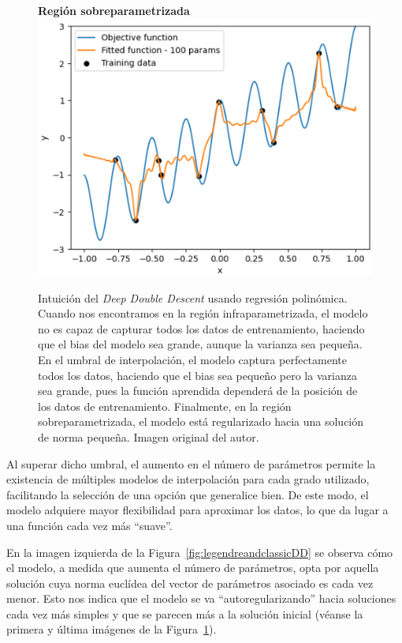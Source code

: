 \begin{figure}[h]
    \begin{minipage}{0.32\textwidth}
        \centering
        \textbf{Región sobreparametrizada} \\[0.5ex] 
        \includegraphics[width=\linewidth]{img/experiments/legendre1.3.png}
    \end{minipage}
    \caption[Intuición del \textit{Deep Double Descent} usando regresión polinómica.]{Intuición del \textit{Deep Double Descent} usando regresión polinómica. Cuando nos encontramos en la región infraparametrizada, el modelo no es capaz de capturar todos los datos de entrenamiento, haciendo que el bias del modelo sea grande, aunque la varianza sea pequeña. En el umbral de interpolación, el modelo captura perfectamente todos los datos, haciendo que el bias sea pequeño pero la varianza sea grande, pues la función aprendida dependerá de la posición de los datos de entrenamiento. Finalmente, en la región sobreparametrizada, el modelo está regularizado hacia una solución de norma pequeña. Imagen original del autor.}\label{fig:legendre1DD}
\end{figure}

Al superar dicho umbral, el aumento en el número de parámetros permite la existencia de múltiples modelos de interpolación para cada grado utilizado, facilitando la selección de una opción que generalice bien. De este modo, el modelo adquiere mayor flexibilidad para aproximar los datos, lo que da lugar a una función cada vez más ``suave''.\newline

En la imagen izquierda de la Figura~\ref{fig:legendreandclassicDD} se observa cómo el modelo, a medida que aumenta el número de parámetros, opta por aquella solución cuya norma euclídea del vector de parámetros asociado es cada vez menor. Esto nos indica que el modelo se va ``autoregularizando'' hacia soluciones cada vez más simples y que se parecen más a la solución inicial (véanse la primera y última imágenes de la Figura~\ref{fig:legendre1DD}).\newline

